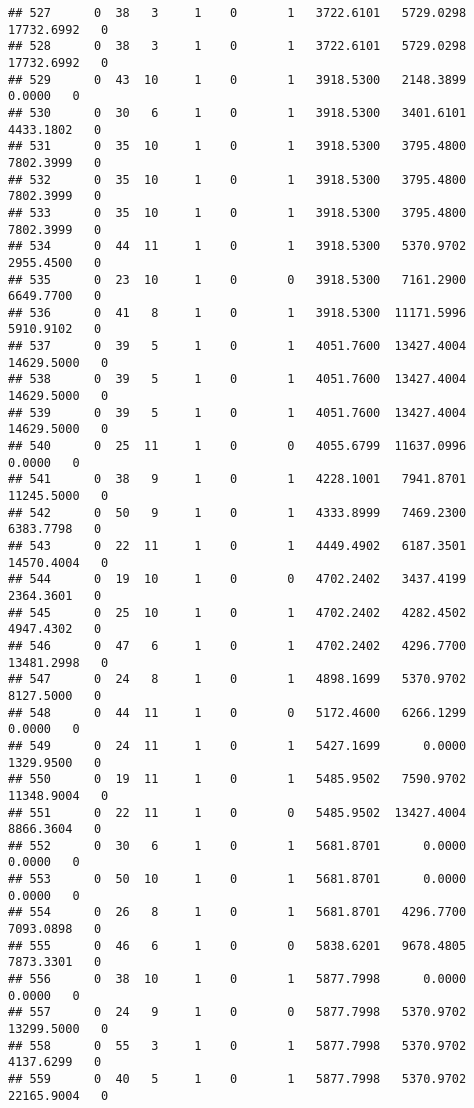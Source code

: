 \documentclass[
]{article}
\begin{document}
\begin{enumerate}
\begin{verbatim}
## 527      0  38   3     1    0       1   3722.6101   5729.0298  17732.6992   0
## 528      0  38   3     1    0       1   3722.6101   5729.0298  17732.6992   0
## 529      0  43  10     1    0       1   3918.5300   2148.3899      0.0000   0
## 530      0  30   6     1    0       1   3918.5300   3401.6101   4433.1802   0
## 531      0  35  10     1    0       1   3918.5300   3795.4800   7802.3999   0
## 532      0  35  10     1    0       1   3918.5300   3795.4800   7802.3999   0
## 533      0  35  10     1    0       1   3918.5300   3795.4800   7802.3999   0
## 534      0  44  11     1    0       1   3918.5300   5370.9702   2955.4500   0
## 535      0  23  10     1    0       0   3918.5300   7161.2900   6649.7700   0
## 536      0  41   8     1    0       1   3918.5300  11171.5996   5910.9102   0
## 537      0  39   5     1    0       1   4051.7600  13427.4004  14629.5000   0
## 538      0  39   5     1    0       1   4051.7600  13427.4004  14629.5000   0
## 539      0  39   5     1    0       1   4051.7600  13427.4004  14629.5000   0
## 540      0  25  11     1    0       0   4055.6799  11637.0996      0.0000   0
## 541      0  38   9     1    0       1   4228.1001   7941.8701  11245.5000   0
## 542      0  50   9     1    0       1   4333.8999   7469.2300   6383.7798   0
## 543      0  22  11     1    0       1   4449.4902   6187.3501  14570.4004   0
## 544      0  19  10     1    0       0   4702.2402   3437.4199   2364.3601   0
## 545      0  25  10     1    0       1   4702.2402   4282.4502   4947.4302   0
## 546      0  47   6     1    0       1   4702.2402   4296.7700  13481.2998   0
## 547      0  24   8     1    0       1   4898.1699   5370.9702   8127.5000   0
## 548      0  44  11     1    0       0   5172.4600   6266.1299      0.0000   0
## 549      0  24  11     1    0       1   5427.1699      0.0000   1329.9500   0
## 550      0  19  11     1    0       1   5485.9502   7590.9702  11348.9004   0
## 551      0  22  11     1    0       0   5485.9502  13427.4004   8866.3604   0
## 552      0  30   6     1    0       1   5681.8701      0.0000      0.0000   0
## 553      0  50  10     1    0       1   5681.8701      0.0000      0.0000   0
## 554      0  26   8     1    0       1   5681.8701   4296.7700   7093.0898   0
## 555      0  46   6     1    0       0   5838.6201   9678.4805   7873.3301   0
## 556      0  38  10     1    0       1   5877.7998      0.0000      0.0000   0
## 557      0  24   9     1    0       0   5877.7998   5370.9702  13299.5000   0
## 558      0  55   3     1    0       1   5877.7998   5370.9702   4137.6299   0
## 559      0  40   5     1    0       1   5877.7998   5370.9702  22165.9004   0

\end{verbatim}
\end{enumerate}
\end{document}
